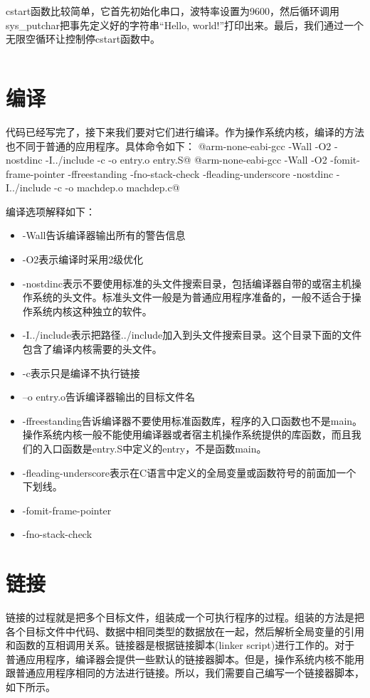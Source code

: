 \documentclass[main.tex]{subfiles}
\begin{document}
\begin{CJK*}{UTF8}{song}
\par
cstart函数比较简单，它首先初始化串口，波特率设置为9600，然后循环调用sys\_putchar把事先定义好的字符串“Hello, world!”打印出来。最后，我们通过一个无限空循环让控制停cstart函数中。

\inputminted[firstline=42,lastline=54,linenos,numbersep=5pt,frame=lines,framesep=2mm]{c}{chapter02/kernel/machdep.c}

\section{编译}
代码已经写完了，接下来我们要对它们进行编译。作为操作系统内核，编译的方法也不同于普通的应用程序。具体命令如下：
@arm-none-eabi-gcc -Wall -O2 -nostdinc -I../include -c -o entry.o entry.S@
@arm-none-eabi-gcc -Wall -O2 -fomit-frame-pointer -ffreestanding -fno-stack-check -fleading-underscore -nostdinc -I../include -c -o machdep.o machdep.c@

编译选项解释如下：
\begin{itemize}
	\item -Wall告诉编译器输出所有的警告信息
	\item -O2表示编译时采用2级优化
	\item -nostdinc表示不要使用标准的头文件搜索目录，包括编译器自带的或宿主机操作系统的头文件。标准头文件一般是为普通应用程序准备的，一般不适合于操作系统内核这种独立的软件。
	\item -I../include表示把路径../include加入到头文件搜索目录。这个目录下面的文件包含了编译内核需要的头文件。
	\item -c表示只是编译不执行链接
	\item –o entry.o告诉编译器输出的目标文件名
	\item -ffreestanding告诉编译器不要使用标准函数库，程序的入口函数也不是main。操作系统内核一般不能使用编译器或者宿主机操作系统提供的库函数，而且我们的入口函数是entry.S中定义的entry，不是函数main。
	\item -fleading-underscore表示在C语言中定义的全局变量或函数符号的前面加一个下划线。
    \item -fomit-frame-pointer
    \item -fno-stack-check
\end{itemize}

\section{链接}
链接的过程就是把多个目标文件，组装成一个可执行程序的过程。组装的方法是把各个目标文件中代码、数据中相同类型的数据放在一起，然后解析全局变量的引用和函数的互相调用关系。链接器是根据链接脚本(linker script)进行工作的。对于普通应用程序，编译器会提供一些默认的链接器脚本。但是，操作系统内核不能用跟普通应用程序相同的方法进行链接。所以，我们需要自己编写一个链接器脚本，如下所示。


\end{CJK*}
\end{document}
